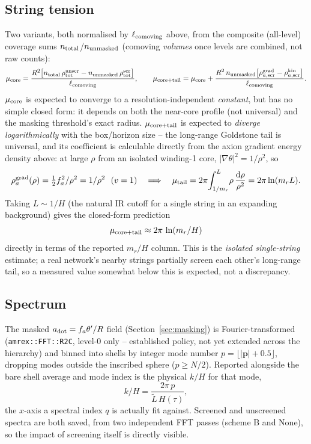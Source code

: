 \documentclass[11pt]{article}
\newcommand{\Rt}{\tilde{L}}
\begin{document}
\subsection{String tension}
\label{sec:tension}
Two variants, both normalised by $\ell_{\rm comoving}$ above, from the composite (all-level) coverage sums
$n_{\rm total}$/$n_{\rm unmasked}$ (comoving \emph{volumes} once levels are combined, not raw counts):
\[
\mu_{\rm core} = \frac{R^2\big[n_{\rm total}\,\rho_{\rm tot}^{\rm unscr} - n_{\rm unmasked}\,\rho_{\rm
tot}^{\rm scr}\big]}{\ell_{\rm comoving}}, \qquad
\mu_{\rm core+tail} = \mu_{\rm core} + \frac{R^2\,n_{\rm unmasked}\big[\rho_{a,\rm scr}^{\rm grad} -
\rho_{a,\rm scr}^{\rm kin}\big]}{\ell_{\rm comoving}}.
\]
$\mu_{\rm core}$ is expected to converge to a resolution-independent \emph{constant}, but has no simple
closed form: it depends on both the near-core profile (not universal) and the masking threshold's exact
radius. $\mu_{\rm core+tail}$ is expected to \emph{diverge logarithmically} with the box/horizon size --
the long-range Goldstone tail is universal, and its coefficient is calculable directly from the axion
gradient energy density above: at large $\rho$ from an isolated winding-1 core, $|\nabla\theta|^2=1/\rho^2$,
so
\[
\rho_a^{\rm grad}(\rho) = \tfrac12 f_a^2/\rho^2 = 1/\rho^2 \ \ (v=1) \quad\Longrightarrow\quad
\mu_{\rm tail} = 2\pi\!\int_{1/m_r}^{L}\!\rho\,\frac{\mathrm{d}\rho}{\rho^2} = 2\pi\ln(m_r L).
\]
Taking $L\sim1/H$ (the natural IR cutoff for a single string in an expanding background) gives the
closed-form prediction
\[
\mu_{\rm core+tail} \approx 2\pi\,\ln(m_r/H)
\]
directly in terms of the reported $m_r/H$ column. This is the \emph{isolated single-string} estimate; a
real network's nearby strings partially screen each other's long-range tail, so a measured value somewhat
below this is expected, not a discrepancy.

\subsection{Spectrum}
\label{sec:spectrum}
The masked $a_{\rm dot}=f_a\theta'/R$ field (Section~\ref{sec:masking}) is Fourier-transformed
(\texttt{amrex::FFT::R2C}, level-0 only -- established policy, not yet extended across the hierarchy) and
binned into shells by integer mode number $p=\lfloor|\mathbf{p}|+0.5\rfloor$, dropping modes outside the
inscribed sphere ($p\ge N/2$). Reported alongside the bare shell average and mode index is the physical
$k/H$ for that mode,
\[
k/H = \frac{2\pi\,p}{\Rt\,H(\tau)},
\]
the $x$-axis a spectral index $q$ is actually fit against. Screened and unscreened spectra are both saved,
from two independent FFT passes (scheme B and None), so the impact of screening itself is directly
visible.
\end{document}
